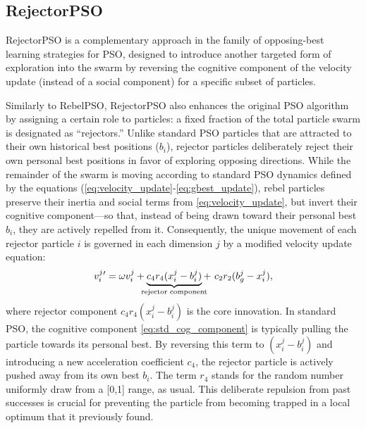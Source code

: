 {\subsection*{RejectorPSO}

RejectorPSO is a complementary approach in the family of opposing-best learning strategies for PSO, designed to introduce another targeted form of exploration into the swarm by reversing the cognitive component of the velocity update (instead of a social component) for a specific subset of particles. 

Similarly to RebelPSO, RejectorPSO also enhances the original PSO algorithm by assigning a certain role to particles:
a fixed fraction of the total particle swarm is designated as ``rejectors.'' Unlike standard PSO particles that are attracted to their own historical best positions ($b_i$), rejector particles deliberately reject their own personal best positions in favor of exploring opposing directions.
While the remainder of the swarm is moving according to standard PSO dynamics defined by the equations (\ref{eq:velocity_update}-\ref{eq:gbest_update}), rebel particles
preserve their inertia and social terms from \eqref{eq:velocity_update}, but invert their cognitive component---so that, instead of being drawn toward their personal best $b_i$, they are actively repelled from it.
Consequently, the unique movement of each rejector particle $i$ is governed in each dimension $j$ by a modified velocity update equation:
\begin{equation}\label{eq:velocity_update_rejector}
v_{i}^{j}{}'= \omega v_{i}^{j} + 
\underbrace{c_4 r_4 (x_{i}^{j} - b_{i}^{j})}_{\mathclap{\text{rejector component}}} +\ 
c_2 r_2 (b_{g}^{j} - x_{i}^{j}),
\end{equation}
where rejector component $c_4 r_4 (x_{i}^{j} - b_{i}^{j})$ is the core innovation. In standard PSO, the cognitive component \eqref{eq:std_cog_component} is typically pulling the particle towards its personal best. By reversing this term to $(x_{i}^{j} - b_{i}^{j})$ and introducing a new acceleration coefficient $c_4$, the rejector particle is actively pushed away from its own best $b_i$. The term $r_4$ stands for the random number uniformly draw from a [0,1] range, as usual. This deliberate repulsion from past successes is crucial for preventing the particle from becoming trapped in a local optimum that it previously found.

\begin{figure}[H]
    \centering
\end{figure}}
